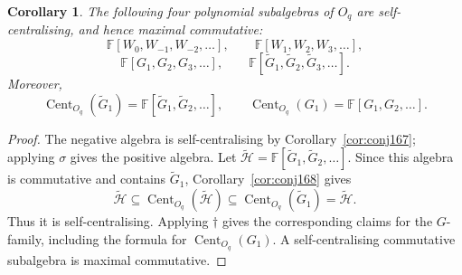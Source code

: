 \documentclass[11pt]{extarticle}
\newtheorem{corollary}[theorem]{Corollary}
\theoremstyle{definition}
\theoremstyle{remark}
\numberwithin{equation}{section}
\newcommand{\F}{\mathbb F}
\newcommand{\Oq}{O_q}
\DeclareMathOperator{\Cent}{Cent}
\begin{document}
\begin{corollary}
\label{cor:four-maximal}
The following four polynomial subalgebras of $\Oq$ are self-centralising,
and hence maximal commutative:
\[
 \F[W_0,W_{-1},W_{-2},\ldots],
 \qquad
 \F[W_1,W_2,W_3,\ldots],
\]
\[
 \F[G_1,G_2,G_3,\ldots],
 \qquad
 \F[\widetilde G_1,\widetilde G_2,\widetilde G_3,\ldots].
\]
Moreover,
\[
 \Cent_{\Oq}(\widetilde G_1)
 =\F[\widetilde G_1,\widetilde G_2,\ldots],
 \qquad
 \Cent_{\Oq}(G_1)=\F[G_1,G_2,\ldots].
\]
\end{corollary}

\begin{proof}
The negative algebra is self-centralising by
Corollary~\ref{cor:conj167}; applying $\sigma$ gives the positive algebra.
Let
$\widetilde{\mathcal H}=\F[\widetilde G_1,\widetilde G_2,\ldots]$.
Since this algebra is commutative and contains $\widetilde G_1$,
Corollary~\ref{cor:conj168} gives
\[
 \widetilde{\mathcal H}
 \subseteq\Cent_{\Oq}(\widetilde{\mathcal H})
 \subseteq\Cent_{\Oq}(\widetilde G_1)
 =\widetilde{\mathcal H}.
\]
Thus it is self-centralising.  Applying $\dagger$ gives the corresponding
claims for the $G$-family, including the formula for $\Cent_{\Oq}(G_1)$.
A self-centralising commutative subalgebra is maximal commutative.
\end{proof}
\end{document}
